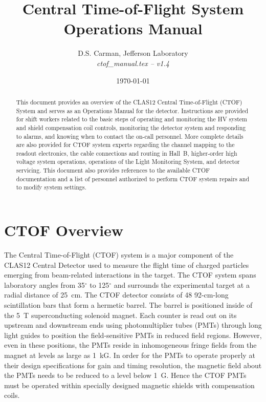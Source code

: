\documentclass[12pt]{article}
\begin{document}
\title{Central Time-of-Flight System Operations Manual}

\vskip 0.5cm

\author{D.S. Carman, Jefferson Laboratory\\[0.2ex]
{\it ctof\_manual.tex -- v1.4}}

\date \today
%
\maketitle

\begin{abstract}
This document provides an overview of the CLAS12 Central Time-of-Flight (CTOF) 
System and serves as an Operations Manual for the detector. Instructions are 
provided for shift workers related to the basic steps of operating and monitoring 
the HV system and shield compensation coil controls, monitoring the detector 
system and responding to alarms, and knowing when to contact the on-call personnel. 
More complete details are also provided for CTOF system experts regarding the 
channel mapping to the readout electronics, the cable connections and routing in 
Hall~B, higher-order high voltage system operations, operations of the Light 
Monitoring System, and detector servicing. This document also provides references 
to the available CTOF documentation and a list of personnel authorized to perform 
CTOF system repairs and to modify system settings.
\end{abstract}

\thispagestyle{empty}

\clearpage

\vfil
\eject

\tableofcontents

\vfil
\eject

\section{CTOF Overview}
\label{intro}

The Central Time-of-Flight (CTOF) system is a major component of the CLAS12 
Central Detector used to measure the flight time of charged particles emerging 
from beam-related interactions in the target. The CTOF system spans laboratory 
angles from 35$^\circ$ to 125$^\circ$ and surrounds the experimental target at a 
radial distance of 25~cm. The CTOF detector consists of 48 92-cm-long scintillation 
bars that form a hermetic barrel. The barrel is positioned inside of the 5~T 
superconducting solenoid magnet. Each counter is read out on its upstream and
downstream ends using photomultiplier tubes (PMTs) through long light guides to 
position the field-sensitive PMTs in reduced field regions. However, even in these 
positions, the PMTs reside in inhomogeneous fringe fields from the magnet at levels 
as large as 1~kG. In order for the PMTs to operate properly at their design 
specifications for gain and timing resolution, the magnetic field about the PMTs 
needs to be reduced to a level below 1~G. Hence the CTOF PMTs must be operated 
within specially designed magnetic shields with compensation coils.
\end{document}
